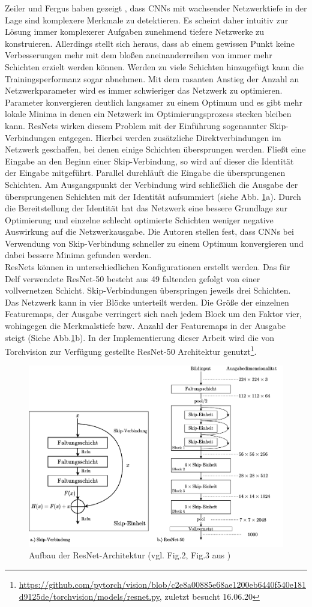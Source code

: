 Zeiler und Fergus haben gezeigt \cite{extraction_point_meaning}, dass CNNs mit wachsender Netzwerktiefe in der Lage sind komplexere Merkmale zu detektieren. Es scheint daher intuitiv zur Lösung immer komplexerer Aufgaben zunehmend tiefere Netzwerke zu konstruieren. Allerdings stellt sich heraus, dass ab einem gewissen Punkt keine Verbesserungen mehr mit dem bloßen aneinanderreihen von immer mehr Schichten erzielt werden können. Werden zu viele Schichten hinzugefügt kann die Trainingsperformanz sogar abnehmen. Mit dem rasanten Anstieg der Anzahl an Netzwerkparameter wird es immer schwieriger das Netzwerk zu optimieren. Parameter konvergieren deutlich langsamer zu einem Optimum und es gibt mehr lokale Minima in denen ein Netzwerk im Optimierungsprozess stecken bleiben kann. ResNets wirken diesem Problem mit der Einführung sogenannter Skip-Verbindungen entgegen. Hierbei werden zusätzliche Direktverbindungen im Netzwerk geschaffen, bei denen einige Schichten übersprungen werden. Fließt eine Eingabe an den Beginn einer Skip-Verbindung, so wird auf dieser die Identität der Eingabe mitgeführt. Parallel durchläuft die Eingabe die übersprungenen Schichten. Am Ausgangspunkt der Verbindung wird schließlich die Ausgabe der übersprungenen Schichten mit der Identität aufsummiert (siehe Abb. \ref{resnet}a). Durch die Bereitstellung der Identität hat das Netzwerk eine bessere Grundlage zur Optimierung und einzelne schlecht optimierte Schichten weniger negative Auswirkung auf die Netzwerkausgabe. Die Autoren stellen fest, dass CNNs bei Verwendung von Skip-Verbindung schneller zu einem Optimum konvergieren und dabei bessere Minima gefunden werden. 
\\
ResNets können in unterschiedlichen Konfigurationen erstellt werden. Das für Delf verwendete \mbox{ResNet-50} besteht aus 49 faltenden gefolgt von einer vollvernetzen Schicht. Skip-Verbindungen überspringen jeweils drei Schichten. Das Netzwerk kann in vier Blöcke unterteilt werden. Die Größe der einzelnen Featuremaps, der Ausgabe verringert sich nach jedem Block um den Faktor vier, wohingegen die Merkmalstiefe bzw. Anzahl der Featuremaps in der Ausgabe steigt (Siehe Abb.\ref{resnet}b). In der Implementierung dieser Arbeit wird die von Torchvision zur Verfügung gestellte ResNet-50 Architektur genutzt\footnote[2]{\url{https://github.com/pytorch/vision/blob/c2e8a00885e68ae1200eb6440f540e181d9125de/torchvision/models/resnet.py}, zuletzt besucht 16.06.20}. 
\begin{figure}
\label{resnet}
\includegraphics[scale=0.70]{resnet-50.pdf}
\caption{Aufbau der ResNet-Architektur (vgl. Fig.2, Fig.3 aus \cite{resnet})}
\end{figure}
